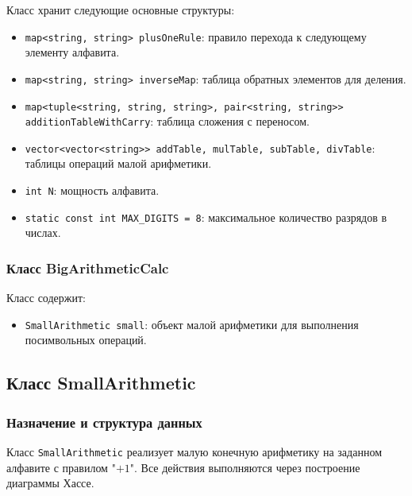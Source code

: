 Класс хранит следующие основные структуры: 
\begin{itemize}
    \item \texttt{map<string, string> plusOneRule}:  правило перехода к следующему элементу алфавита. 
    
    
    \item \texttt{map<string, string> inverseMap}: таблица обратных элементов для деления.
    
    \item \texttt{map<tuple<string, string, string>, pair<string, string>>
additionTableWithCarry}: таблица сложения с переносом.
    
    \item \texttt{vector<vector<string>> addTable, mulTable, subTable, divTable}: таблицы операций малой арифметики.
    
    \item \texttt{int N}: мощность алфавита. 
    
    \item \texttt{static const int MAX\_DIGITS = 8}: максимальное количество разрядов в числах.
\end{itemize}

\subsubsection{Класс BigArithmeticCalc}

Класс содержит: 
\begin{itemize}
    \item \texttt{SmallArithmetic small}: объект малой арифметики для выполнения посимвольных операций. 
\end{itemize}
\subsection{Класс SmallArithmetic}

\subsubsection{Назначение и структура данных}

Класс \texttt{SmallArithmetic} реализует малую конечную арифметику на заданном алфавите с правилом "$+1$". Все действия выполняются через построение диаграммы Хассе.

